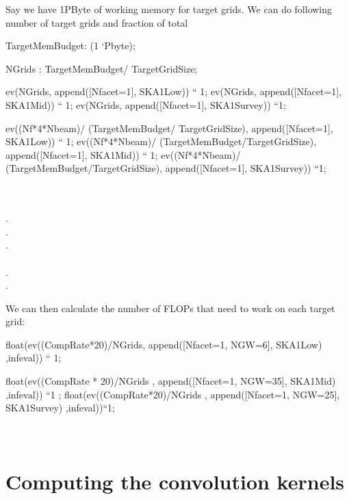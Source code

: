 \documentclass[useAMS,usenatbib,referee]{article}
\begin{document}
Say we have 1PByte of working memory for target grids. We can do
following number of target grids and fraction of total
\begin{maxima}[]
TargetMemBudget: (1 `Pbyte);

NGrids : TargetMemBudget/ TargetGridSize;

ev(NGrids, append([Nfacet=1], SKA1Low)) `` 1;
ev(NGrids, append([Nfacet=1], SKA1Mid))  `` 1;
ev(NGrids, append([Nfacet=1], SKA1Survey)) ``1;

ev((Nf*4*Nbeam)/  (TargetMemBudget/ TargetGridSize), append([Nfacet=1], SKA1Low)) `` 1;
ev((Nf*4*Nbeam)/ (TargetMemBudget/TargetGridSize), append([Nfacet=1], SKA1Mid))  `` 1;
ev((Nf*4*Nbeam)/ (TargetMemBudget/TargetGridSize), append([Nfacet=1], SKA1Survey)) ``1;


\maximaoutput*
{}\; \\
 \\
. \\
. \\
. \\
 \\
. \\
. \\
\end{maxima}

We can then calculate the number of FLOPs that need to work on each
target grid:

\begin{maxima}[]

float(ev((CompRate*20)/NGrids, append([Nfacet=1, NGW=6], SKA1Low)
,infeval)) `` 1;

float(ev((CompRate * 20)/NGrids  , append([Nfacet=1, NGW=35], SKA1Mid)
,infeval)) ``1 ;
float(ev((CompRate*20)/NGrids  , append([Nfacet=1, NGW=25], SKA1Survey) ,infeval))``1;
\maximaoutput*
{} \\
 \\
 \\
\end{maxima}

\section{Computing the convolution kernels}
\end{document}
